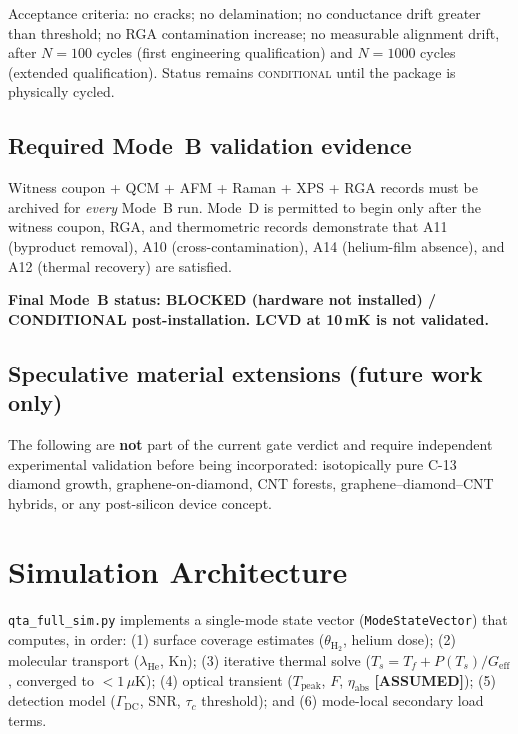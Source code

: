 \documentclass[12pt,a4paper]{article}
\newcommand{\conditional}{\textsc{conditional}}
\newcommand{\assumed}{\textbf{[ASSUMED]}}
\begin{document}
Acceptance criteria:
no cracks; no delamination; no conductance drift greater than threshold;
no RGA contamination increase; no measurable alignment drift,
after $N=100$ cycles (first engineering qualification) and
$N=1000$ cycles (extended qualification). Status remains \conditional{} until
the package is physically cycled.

\subsection*{Required Mode~B validation evidence}
Witness coupon + QCM + AFM + Raman + XPS + RGA records must be archived for
\emph{every} Mode~B run. Mode~D is permitted to begin only after the witness
coupon, RGA, and thermometric records demonstrate that A11 (byproduct removal),
A10 (cross-contamination), A14 (helium-film absence), and A12 (thermal recovery)
are satisfied.

\textbf{Final Mode~B status: BLOCKED (hardware not installed) /
CONDITIONAL post-installation. LCVD at 10\,mK is not validated.}

\subsection{Speculative material extensions (future work only)}
The following are \textbf{not} part of the current gate verdict and require
independent experimental validation before being incorporated:
isotopically pure C-13 diamond growth, graphene-on-diamond, CNT forests,
graphene--diamond--CNT hybrids, or any post-silicon device concept.



\section{Simulation Architecture}
\label{sec:sim}

\texttt{qta\_full\_sim.py} implements a single-mode state vector
(\texttt{ModeStateVector}) that computes, in order:
(1) surface coverage estimates ($\theta_\mathrm{H_2}$, helium dose);
(2) molecular transport ($\lambda_\mathrm{He}$, $\mathrm{Kn}$);
(3) iterative thermal solve ($T_s = T_f + P(T_s)/G_\mathrm{eff}$, converged to $<1\,\mu$K);
(4) optical transient ($T_\mathrm{peak}$, $F$, $\eta_\mathrm{abs}$ \assumed{});
(5) detection model ($\Gamma_\mathrm{DC}$, SNR, $\tau_c$ threshold); and
(6) mode-local secondary load terms.
\end{document}
